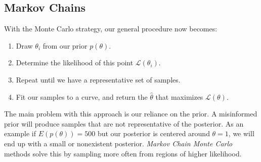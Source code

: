 \subsection{Markov Chains}\label{subsec:markovChainMonteCarlo}
With the Monte Carlo strategy, our general procedure now becomes:
\begin{enumerate}
    \item Draw $\theta_i$ from our prior $p(\theta)$.
    \item Determine the likelihood of this point $\mathcal{L}(\theta_i)$.
    \item Repeat until we have a representative set of samples.
    \item Fit our samples to a curve, and return the $\hat{\theta}$ that maximizes $\mathcal{L}(\theta)$.
\end{enumerate}
The main problem with this approach is our reliance on the prior.
A misinformed prior will produce samples that are not representative of the posterior.
As an example if $E(p(\theta)) = 500$ but our posterior is centered around $\theta = 1$, we will end up with a small or
nonexistent posterior.
\emph{Markov Chain Monte Carlo} methods solve this by sampling more often from regions of higher likelihood.

